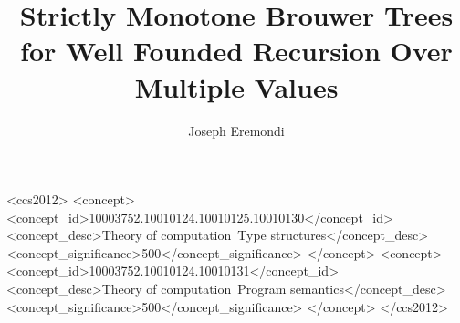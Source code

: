 \documentclass[dvipsnames,sigplan,10pt,anonymous,review]{acmart}\settopmatter{printfolios=true,printccs=false,printacmref=false}
\begin{document}
\title{Strictly Monotone Brouwer Trees for Well Founded Recursion Over Multiple Values}


  \author{Joseph Eremondi}





\renewcommand{\shortauthors}{Joseph Eremondi, Ronald Garcia, and \'Eric Tanter}




\begin{abstract}
  
\end{abstract}

\begin{CCSXML}
<ccs2012>
<concept>
<concept_id>10003752.10010124.10010125.10010130</concept_id>
<concept_desc>Theory of computation~Type structures</concept_desc>
<concept_significance>500</concept_significance>
</concept>
<concept>
<concept_id>10003752.10010124.10010131</concept_id>
<concept_desc>Theory of computation~Program semantics</concept_desc>
<concept_significance>500</concept_significance>
</concept>
</ccs2012>
\end{CCSXML}
\end{document}
